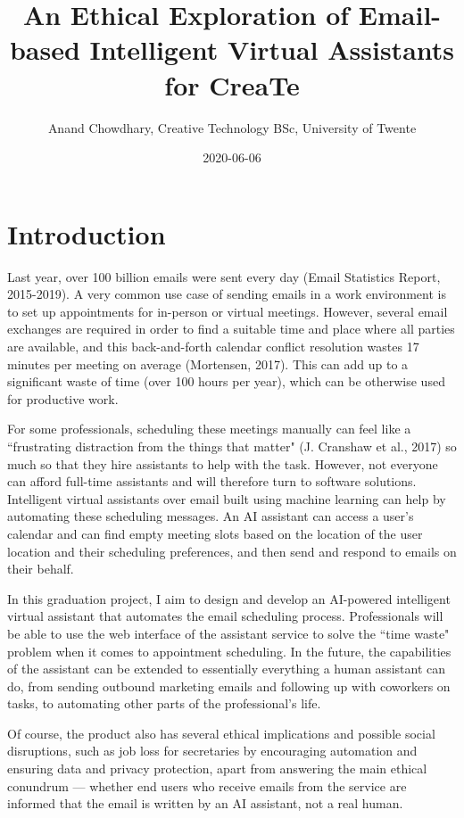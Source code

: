 \documentclass{article}
\title{An Ethical Exploration of Email-based Intelligent Virtual Assistants for CreaTe}
\date{2020-06-06}
\author{Anand Chowdhary, Creative Technology BSc, University of Twente}
\begin{document}
  \maketitle
  \tableofcontents
  \newpage

\section{Introduction}

Last year, over 100 billion emails were sent every day (Email Statistics Report, 2015-2019). A very common use case of sending emails in a work environment is to set up appointments for in-person or virtual meetings. However, several email exchanges are required in order to find a suitable time and place where all parties are available, and this back-and-forth calendar conflict resolution wastes 17 minutes per meeting on average (Mortensen, 2017). This can add up to a significant waste of time (over 100 hours per year), which can be otherwise used for productive work.

For some professionals, scheduling these meetings manually can feel like a ``frustrating distraction from the things that matter" (J. Cranshaw et al., 2017) so much so that they hire assistants to help with the task. However, not everyone can afford full-time assistants and will therefore turn to software solutions. Intelligent virtual assistants over email built using machine learning can help by automating these scheduling messages. An AI assistant can access a user’s calendar and can find empty meeting slots based on the location of the user location and their scheduling preferences, and then send and respond to emails on their behalf.

In this graduation project, I aim to design and develop an AI-powered intelligent virtual assistant that automates the email scheduling process. Professionals will be able to use the web interface of the assistant service to solve the ``time waste" problem when it comes to appointment scheduling. In the future, the capabilities of the assistant can be extended to essentially everything a human assistant can do, from sending outbound marketing emails and following up with coworkers on tasks, to automating other parts of the professional’s life.

Of course, the product also has several ethical implications and possible social disruptions, such as job loss for secretaries by encouraging automation and ensuring data and privacy protection, apart from answering the main ethical conundrum — whether end users who receive emails from the service are informed that the email is written by an AI assistant, not a real human.
\end{document}
